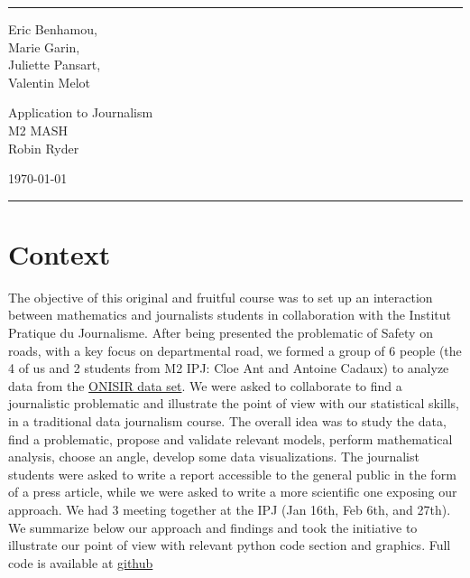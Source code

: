 \documentclass[a4paper]{article}
\theoremstyle{definition}
\theoremstyle{proposition}
\begin{document}

\fancyhead[C]{}
\hrule \medskip %
\begin{minipage}{0.295\textwidth} 
\raggedright
\footnotesize
Eric Benhamou, \hfill\\   
Marie Garin, \hfill\\   
Juliette Pansart, \hfill\\
Valentin Melot  \hfill\\
\end{minipage}
\begin{minipage}{0.4\textwidth} 
\centering 
\large 
Application to Journalism\\ 
\normalsize 
M2 MASH \\ 
Robin Ryder
\end{minipage}
\begin{minipage}{0.295\textwidth} 
\raggedleft
\today\hfill\\
\end{minipage}
\medskip\hrule 
\bigskip


\section{Context}
The objective of this original and fruitful course was to set up an interaction between mathematics and journalists students in collaboration with the Institut Pratique du Journalisme. After being presented the problematic of Safety on roads, with a key focus on departmental road, we formed a group of 6 people (the 4 of us and 2 students from M2 IPJ: Cloe Ant and Antoine Cadaux) to analyze data from the \href{https://www.data.gouv.fr/fr/datasets/base-de-donnees-accidents-corporels-de-la-circulation/}{ONISIR data set}. We were asked to collaborate to find a journalistic problematic and illustrate the point of view with our statistical skills, in a traditional data journalism course. The overall idea was to study the data, find a problematic, propose and validate relevant models, perform mathematical analysis, choose an angle, develop some data visualizations. The journalist students were asked to write a report accessible to the general public in the form of a press article, while we were asked to write a more scientific one exposing our approach. We had 3 meeting together at the IPJ (Jan 16th, Feb 6th, and 27th). We summarize below our approach and findings and took the initiative to illustrate our point of view with relevant python code section and graphics. Full code is available at \href{https://github.com/ericbenhamou/MASH_IPJ_2018}{github}
\end{document}
